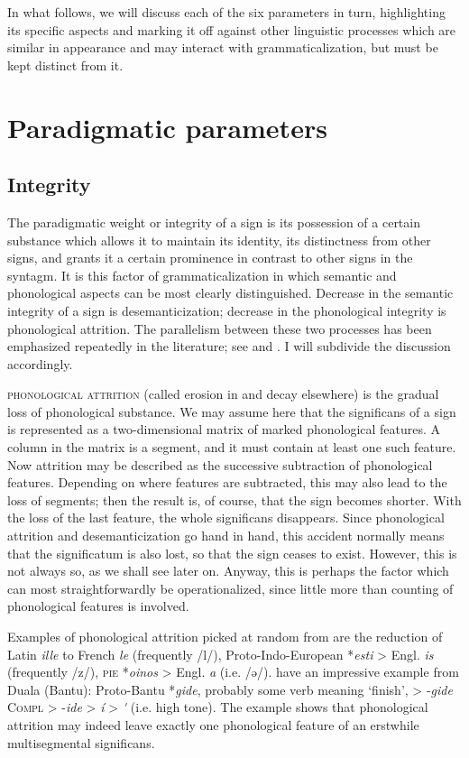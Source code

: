 In what follows, we will discuss each of the six parameters in turn, highlighting its specific aspects and marking it off against other linguistic processes which are similar in appearance and may interact with grammaticalization, but must be kept distinct from it.

\section{Paradigmatic parameters}
\subsection{Integrity} \label{sec:4.2.1}

The paradigmatic weight or integrity of a sign is its possession of a certain substance which allows it to maintain its identity, its distinctness from other signs, and grants it a certain prominence in contrast to other signs in the syntagm. It is this factor of grammaticalization in which semantic and phonological aspects can be most clearly distinguished. Decrease in the semantic integrity of a sign is desemanticization; decrease in the phonological integrity is phonological attrition. The parallelism between these two processes has been emphasized repeatedly in the literature; see \citet[135--139]{Meillet1912} and \citet[114--119]{Lehmann1974}. I will subdivide the discussion accordingly.

\textsc{phonological attrition} (called erosion in \citealt[21ff]{HeineEtAl1984} and decay elsewhere) is the gradual loss of phonological substance. We may assume here that the significans of a sign is represented as a two-dimensional matrix of marked phonological features. A column in the matrix is a segment, and it must contain at least one such feature. Now attrition may be described as the successive subtraction of phonological features. Depending on where features are subtracted, this may also lead to the loss of segments; then the result is, of course, that the sign becomes shorter. With the loss of the last feature, the whole significans disappears. Since phonological attrition and desemanticization go hand in hand, this accident normally means that the significatum is also lost, so that the sign ceases to exist. However, this is not always so, as we shall see later on. Anyway, this is perhaps the factor which can most straightforwardly be operationalized, since little more than counting of phonological features is involved.

Examples of phonological attrition picked at random from  are the reduction of Latin \textit{ille} to French \textit{le} (frequently /l/), Proto-Indo-European *\textit{esti} {\textgreater} Engl. \textit{is} (frequently /z/), \textsc{pie} *\textit{oinos} {\textgreater} Engl. \textit{a} (i.e. /ə/). \citet[25]{HeineEtAl1984} have an impressive example from Duala (Bantu): Proto-Bantu *\textit{gide}, probably some verb meaning ‘finish’, {\textgreater} -\textit{gide} \textsc{Compl} {\textgreater} -\textit{ide} {\textgreater} \textit{í} {\textgreater} \textit{\'{ }} (i.e. high tone). The example shows that phonological attrition may indeed leave exactly one phonological feature of an erstwhile multisegmental significans.

